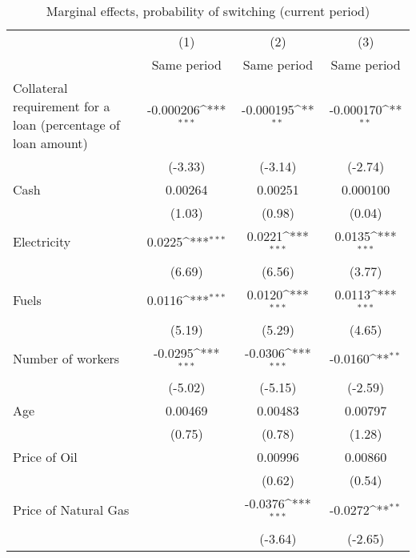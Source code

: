 \begin{table}[htbp]\centering
\def\sym#1{\ifmmode^{#1}\else\(^{#1}\)\fi}
\caption{Marginal effects, probability of switching (current period)}
\begin{tabular}{l*{3}{c}}
\hline\hline
                    &\multicolumn{1}{c}{(1)}&\multicolumn{1}{c}{(2)}&\multicolumn{1}{c}{(3)}\\
                    &\multicolumn{1}{c}{Same period}&\multicolumn{1}{c}{Same period}&\multicolumn{1}{c}{Same period}\\
\hline
Collateral requirement for a loan (percentage of loan amount)&   -0.000206\sym{***}&   -0.000195\sym{**} &   -0.000170\sym{**} \\
                    &     (-3.33)         &     (-3.14)         &     (-2.74)         \\
[1em]
Cash                &     0.00264         &     0.00251         &    0.000100         \\
                    &      (1.03)         &      (0.98)         &      (0.04)         \\
[1em]
Electricity         &      0.0225\sym{***}&      0.0221\sym{***}&      0.0135\sym{***}\\
                    &      (6.69)         &      (6.56)         &      (3.77)         \\
[1em]
Fuels               &      0.0116\sym{***}&      0.0120\sym{***}&      0.0113\sym{***}\\
                    &      (5.19)         &      (5.29)         &      (4.65)         \\
[1em]
Number of workers   &     -0.0295\sym{***}&     -0.0306\sym{***}&     -0.0160\sym{**} \\
                    &     (-5.02)         &     (-5.15)         &     (-2.59)         \\
[1em]
Age                 &     0.00469         &     0.00483         &     0.00797         \\
                    &      (0.75)         &      (0.78)         &      (1.28)         \\
[1em]
Price of Oil        &                     &     0.00996         &     0.00860         \\
                    &                     &      (0.62)         &      (0.54)         \\
[1em]
Price of Natural Gas&                     &     -0.0376\sym{***}&     -0.0272\sym{**} \\
                    &                     &     (-3.64)         &     (-2.65)         \\

\end{tabular}
\end{table}
